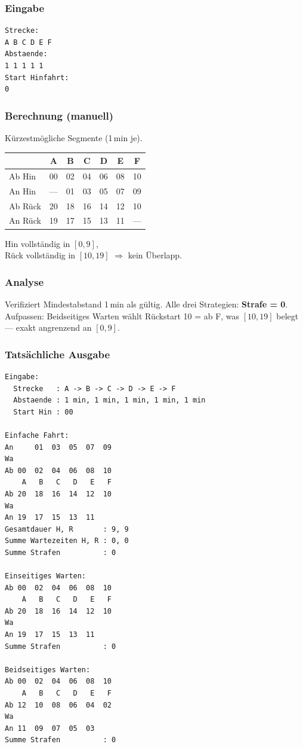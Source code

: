 \documentclass[12pt,a4paper]{article}
\begin{document}
\noindent
\begin{minipage}[t]{0.48\textwidth}
\scriptsize
\setlength{\tabcolsep}{2pt}

\subsubsection*{Eingabe}
\begin{lstlisting}
Strecke:
A B C D E F
Abstaende:
1 1 1 1 1
Start Hinfahrt:
0
\end{lstlisting}

\subsubsection*{Berechnung (manuell)}
Kürzestmögliche Segmente (1\,min je).\\[2pt]
\begin{tabular}{l|cccccc}
\toprule
 & A & B & C & D & E & F\\
\midrule
Ab Hin  & 00 & 02 & 04 & 06 & 08 & 10\\
An Hin  & —  & 01 & 03 & 05 & 07 & 09\\
Ab Rück & 20 & 18 & 16 & 14 & 12 & 10\\
An Rück & 19 & 17 & 15 & 13 & 11 & —\\
\bottomrule
\end{tabular}

\vspace{4pt}
Hin vollständig in $[0,9]$,\\
Rück vollständig in $[10,19]$ $\Rightarrow$ kein Überlapp.

\subsubsection*{Analyse}
Verifiziert Mindestabstand 1\,min als gültig.
Alle drei Strategien: \textbf{Strafe = 0}.
Aufpassen: Beidseitiges Warten wählt Rückstart 10 = ab F, was $[10,19]$ belegt — exakt angrenzend an $[0,9]$.
\end{minipage}
\hfill
\begin{minipage}[t]{0.48\textwidth}
\scriptsize
\subsubsection*{Tatsächliche Ausgabe}
\begin{lstlisting}
Eingabe:
  Strecke   : A -> B -> C -> D -> E -> F
  Abstaende : 1 min, 1 min, 1 min, 1 min, 1 min
  Start Hin : 00

Einfache Fahrt:
An     01  03  05  07  09
Wa
Ab 00  02  04  06  08  10
    A   B   C   D   E   F
Ab 20  18  16  14  12  10
Wa
An 19  17  15  13  11
Gesamtdauer H, R       : 9, 9
Summe Wartezeiten H, R : 0, 0
Summe Strafen          : 0

Einseitiges Warten:
Ab 00  02  04  06  08  10
    A   B   C   D   E   F
Ab 20  18  16  14  12  10
Wa
An 19  17  15  13  11
Summe Strafen          : 0

Beidseitiges Warten:
Ab 00  02  04  06  08  10
    A   B   C   D   E   F
Ab 12  10  08  06  04  02
Wa
An 11  09  07  05  03
Summe Strafen          : 0
\end{lstlisting}
\end{minipage}
\end{document}
